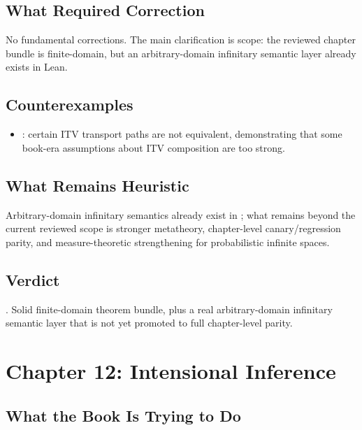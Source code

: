 \documentclass[11pt,openany]{report}
\begin{document}
\section{What Required Correction}

No fundamental corrections.  The main clarification is scope: the
reviewed chapter bundle is finite-domain, but an arbitrary-domain
infinitary semantic layer already exists in Lean.

\section{Counterexamples}

\begin{itemize}
\item {}: certain ITV
  transport paths are not equivalent, demonstrating that some book-era
  assumptions about ITV composition are too strong.
\end{itemize}

\section{What Remains Heuristic}

Arbitrary-domain infinitary semantics already exist in
; what remains
beyond the current reviewed scope is stronger metatheory, chapter-level
canary/regression parity, and measure-theoretic strengthening for
probabilistic infinite spaces.

\section{Verdict}

\verdictAssumption{}.  Solid finite-domain theorem bundle, plus a real
arbitrary-domain infinitary semantic layer that is not yet promoted to
full chapter-level parity.


\chapter{Chapter 12: Intensional Inference}
\label{ch:review-ch12}

\section{What the Book Is Trying to Do}
\end{document}
